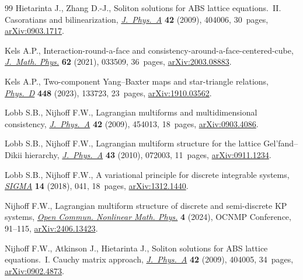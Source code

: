 \begin{thebibliography}{99}
Hietarinta J., Zhang D.-J., Soliton solutions for {ABS} lattice equations.~{II}.
 {C}asoratians and bilinearization,
 \href{https://doi.org/10.1088/1751-8113/42/40/404006}{\textit{J.~Phys.~A}}
 \textbf{42} (2009), 404006, 30~pages,
 \href{http://arxiv.org/abs/0903.1717}{arXiv:0903.1717}.

Kels A.P., Interaction-round-a-face and
 consistency-around-a-face-centered-cube,
 \href{https://doi.org/10.1063/5.0024630}{\textit{J.~Math. Phys.}} \textbf{62}
 (2021), 033509, 36~pages,
 \href{http://arxiv.org/abs/2003.08883}{arXiv:2003.08883}.

Kels A.P., Two-component {Y}ang--{B}axter maps and star-triangle relations,
 \href{https://doi.org/10.1016/j.physd.2023.133723}{\textit{Phys.~D}}
 \textbf{448} (2023), 133723, 23~pages,
 \href{http://arxiv.org/abs/1910.03562}{arXiv:1910.03562}.

Lobb S.B., Nijhoff F.W., Lagrangian multiforms and multidimensional
 consistency,
 \href{https://doi.org/10.1088/1751-8113/42/45/454013}{\textit{J.~Phys.~A}}
 \textbf{42} (2009), 454013, 18~pages,
 \href{http://arxiv.org/abs/0903.4086}{arXiv:0903.4086}.

Lobb S.B., Nijhoff F.W., Lagrangian multiform structure for the lattice
 {G}el'fand--{D}ikii hierarchy,
 \href{https://doi.org/10.1088/1751-8113/43/7/072003}{\textit{J.~Phys.~A}}
 \textbf{43} (2010), 072003, 11~pages,
 \href{http://arxiv.org/abs/0911.1234}{arXiv:0911.1234}.

Lobb S.B., Nijhoff F.W., A variational principle for discrete integrable
 systems, \href{https://doi.org/10.3842/SIGMA.2018.041}{\textit{SIGMA}}
 \textbf{14} (2018), 041, 18~pages,
 \href{http://arxiv.org/abs/1312.1440}{arXiv:1312.1440}.

Nijhoff F.W., Lagrangian multiform structure of discrete and semi-discrete {KP}
 systems, \href{https://doi.org/10.46298/ocnmp.13809}{\textit{Open Commun.
 Nonlinear Math. Phys.}} \textbf{4} (2024), OCNMP Conference, 91--115,
 \href{http://arxiv.org/abs/2406.13423}{arXiv:2406.13423}.

Nijhoff F.W., Atkinson J., Hietarinta J., Soliton solutions for {ABS} lattice
 equations.~{I}. {C}auchy matrix approach,
 \href{https://doi.org/10.1088/1751-8113/42/40/404005}{\textit{J.~Phys.~A}}
 \textbf{42} (2009), 404005, 34~pages,
 \href{http://arxiv.org/abs/0902.4873}{arXiv:0902.4873}.


\end{thebibliography}
